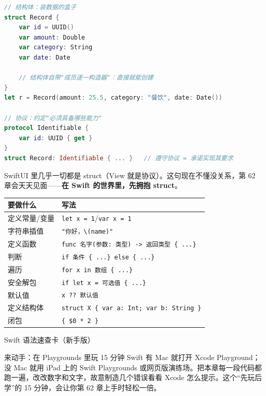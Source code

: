 \begin{lstlisting}[language=Swift]
// 结构体：装数据的盒子
struct Record {
    var id = UUID()
    var amount: Double
    var category: String
    var date: Date

    // 结构体自带"成员逐一构造器"：直接就能创建
}
let r = Record(amount: 25.5, category: "餐饮", date: Date())

// 协议：约定"必须具备哪些能力"
protocol Identifiable {
    var id: UUID { get }
}
struct Record: Identifiable { ... }   // 遵守协议 = 承诺实现其要求
\end{lstlisting}

SwiftUI 里几乎一切都是 struct（View 就是协议）。这句现在不懂没关系，第 62 章会天天见面——\textbf{在 Swift 的世界里，先拥抱 struct}。


\begin{center}
\begin{tabularx}{\linewidth}{|X|X|}
\hline
\textbf{要做什么} & \textbf{写法} \tabularnewline
\hline
定义常量/变量 & \texttt{let x = 1}/\texttt{var x = 1} \tabularnewline
字符串插值 & \texttt{"你好，\textbackslash{}(name)"} \tabularnewline
定义函数 & \texttt{func 名字(参数: 类型) -\allowbreak > 返回类型 \{ .\allowbreak .\allowbreak .\allowbreak  \}} \tabularnewline
判断 & \texttt{if 条件 \{ .\allowbreak .\allowbreak .\allowbreak  \} else \{ .\allowbreak .\allowbreak .\allowbreak  \}} \tabularnewline
遍历 & \texttt{for x in 数组 \{ .\allowbreak .\allowbreak .\allowbreak  \}} \tabularnewline
安全解包 & \texttt{if let x = 可选值 \{ .\allowbreak .\allowbreak .\allowbreak  \}} \tabularnewline
默认值 & \texttt{x ?? 默认值} \tabularnewline
定义结构体 & \texttt{struct X \{ var a: Int; var b: String \}} \tabularnewline
闭包 & \texttt{\{ \$0 * 2 \}} \tabularnewline
\hline
\end{tabularx}
\end{center}

\begin{center}\small\color{gray}Swift 语法速查卡（新手版）\end{center}

\begin{tcbpractice}{来动手：在 Playgrounds 里玩 15 分钟 Swift}
有 Mac 就打开 Xcode Playground；没 Mac 就用 iPad 上的 Swift Playgrounds 或网页版演练场。把本章每一段代码都跑一遍，改改数字和文字，故意制造几个错误看看 Xcode 怎么提示。这个“先玩后学”的 15 分钟，会让你第 62 章上手时轻松一倍。

\end{tcbpractice}

